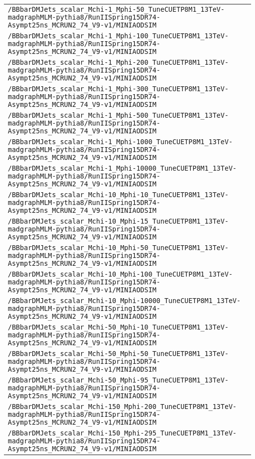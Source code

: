\begin{center}
\begin{tabular}{l}
\verb!/BBbarDMJets_scalar_Mchi-1_Mphi-50_TuneCUETP8M1_13TeV-madgraphMLM-pythia8/RunIISpring15DR74-Asympt25ns_MCRUN2_74_V9-v1/MINIAODSIM! \tabularnewline
\verb!/BBbarDMJets_scalar_Mchi-1_Mphi-100_TuneCUETP8M1_13TeV-madgraphMLM-pythia8/RunIISpring15DR74-Asympt25ns_MCRUN2_74_V9-v1/MINIAODSIM! \tabularnewline
\verb!/BBbarDMJets_scalar_Mchi-1_Mphi-200_TuneCUETP8M1_13TeV-madgraphMLM-pythia8/RunIISpring15DR74-Asympt25ns_MCRUN2_74_V9-v1/MINIAODSIM! \tabularnewline
\verb!/BBbarDMJets_scalar_Mchi-1_Mphi-300_TuneCUETP8M1_13TeV-madgraphMLM-pythia8/RunIISpring15DR74-Asympt25ns_MCRUN2_74_V9-v1/MINIAODSIM! \tabularnewline
\verb!/BBbarDMJets_scalar_Mchi-1_Mphi-500_TuneCUETP8M1_13TeV-madgraphMLM-pythia8/RunIISpring15DR74-Asympt25ns_MCRUN2_74_V9-v1/MINIAODSIM! \tabularnewline
\verb!/BBbarDMJets_scalar_Mchi-1_Mphi-1000_TuneCUETP8M1_13TeV-madgraphMLM-pythia8/RunIISpring15DR74-Asympt25ns_MCRUN2_74_V9-v1/MINIAODSIM! \tabularnewline
\verb!/BBbarDMJets_scalar_Mchi-1_Mphi-10000_TuneCUETP8M1_13TeV-madgraphMLM-pythia8/RunIISpring15DR74-Asympt25ns_MCRUN2_74_V9-v1/MINIAODSIM! \tabularnewline
\verb!/BBbarDMJets_scalar_Mchi-10_Mphi-10_TuneCUETP8M1_13TeV-madgraphMLM-pythia8/RunIISpring15DR74-Asympt25ns_MCRUN2_74_V9-v1/MINIAODSIM! \tabularnewline
\verb!/BBbarDMJets_scalar_Mchi-10_Mphi-15_TuneCUETP8M1_13TeV-madgraphMLM-pythia8/RunIISpring15DR74-Asympt25ns_MCRUN2_74_V9-v1/MINIAODSIM! \tabularnewline
\verb!/BBbarDMJets_scalar_Mchi-10_Mphi-50_TuneCUETP8M1_13TeV-madgraphMLM-pythia8/RunIISpring15DR74-Asympt25ns_MCRUN2_74_V9-v1/MINIAODSIM! \tabularnewline
\verb!/BBbarDMJets_scalar_Mchi-10_Mphi-100_TuneCUETP8M1_13TeV-madgraphMLM-pythia8/RunIISpring15DR74-Asympt25ns_MCRUN2_74_V9-v1/MINIAODSIM! \tabularnewline
\verb!/BBbarDMJets_scalar_Mchi-10_Mphi-10000_TuneCUETP8M1_13TeV-madgraphMLM-pythia8/RunIISpring15DR74-Asympt25ns_MCRUN2_74_V9-v1/MINIAODSIM! \tabularnewline
\verb!/BBbarDMJets_scalar_Mchi-50_Mphi-10_TuneCUETP8M1_13TeV-madgraphMLM-pythia8/RunIISpring15DR74-Asympt25ns_MCRUN2_74_V9-v1/MINIAODSIM! \tabularnewline
\verb!/BBbarDMJets_scalar_Mchi-50_Mphi-50_TuneCUETP8M1_13TeV-madgraphMLM-pythia8/RunIISpring15DR74-Asympt25ns_MCRUN2_74_V9-v1/MINIAODSIM! \tabularnewline
\verb!/BBbarDMJets_scalar_Mchi-50_Mphi-95_TuneCUETP8M1_13TeV-madgraphMLM-pythia8/RunIISpring15DR74-Asympt25ns_MCRUN2_74_V9-v1/MINIAODSIM! \tabularnewline
\verb!/BBbarDMJets_scalar_Mchi-150_Mphi-200_TuneCUETP8M1_13TeV-madgraphMLM-pythia8/RunIISpring15DR74-Asympt25ns_MCRUN2_74_V9-v1/MINIAODSIM! \tabularnewline
\verb!/BBbarDMJets_scalar_Mchi-150_Mphi-295_TuneCUETP8M1_13TeV-madgraphMLM-pythia8/RunIISpring15DR74-Asympt25ns_MCRUN2_74_V9-v1/MINIAODSIM! \tabularnewline

\end{tabular}
\end{center}
